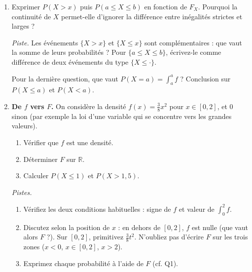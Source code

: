 \begin{enumerate}
  \item Exprimer $P(X>x)$ puis $P(a\le X\le b)$ en fonction de $F_X$.
  Pourquoi la continuité de $X$ permet-elle d'ignorer la différence
  entre inégalités strictes et larges ?
  \begin{solution}
    \textit{Piste.} Les événements $\{X>x\}$ et $\{X\le x\}$ sont
    complémentaires : que vaut la somme de leurs probabilités ?
    Pour $\{a\le X\le b\}$, écrivez-le comme différence de deux
    événements du type $\{X\le\cdot\}$.

    Pour la dernière question, que vaut $P(X=a)=\int_a^a f$ ?
    Conclusion sur $P(X\le a)$ et $P(X<a)$.
  \end{solution}

  \item \textbf{De $f$ vers $F$.}
  On considère la densité
  $f(x)=\tfrac{3}{8}x^2$ pour $x\in[0,2]$, et $0$ sinon
  (par exemple la loi d'une variable qui se concentre vers les
  grandes valeurs).
  \begin{enumerate}
    \item Vérifier que $f$ est une densité.
    \item Déterminer $F$ sur $\mathbb R$.
    \item Calculer $P(X\le 1)$ et $P(X>1{,}5)$.
  \end{enumerate}
  \begin{solution}
    \textit{Pistes.}
    \begin{enumerate}
    \item Vérifiez les deux conditions habituelles : signe de $f$
    et valeur de $\int_0^2 f$.
    \item Discutez selon la position de $x$ : en dehors de $[0,2]$,
    $f$ est nulle (que vaut alors $F$ ?). Sur $[0,2]$,
    primitivez $\tfrac{3}{8}t^2$. N'oubliez pas d'écrire $F$ sur les
    trois zones ($x<0$, $x\in[0,2]$, $x>2$).
    \item Exprimez chaque probabilité à l'aide de $F$ (cf. Q1).
    \end{enumerate}
  \end{solution}
  \newpage


\end{enumerate}
